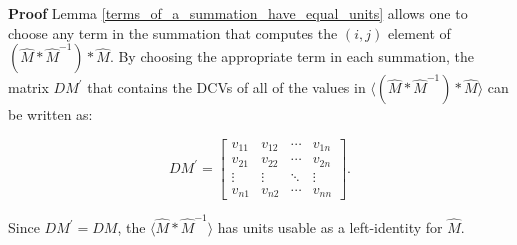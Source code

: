\documentclass[10pt,letterpaper]{article}
\newenvironment{proof}{\noindent\textbf{Proof} }{\qed \newline}
\newcommand{\qed}{\nobreak \ifvmode \relax \else
      \ifdim\lastskip<1.5em \hskip-\lastskip
      \hskip1.5em plus0em minus0.5em \fi \nobreak
      \vrule height0.75em width0.5em depth0.25em\fi}
\numberwithin{equation}{section}
\begin{document}
\begin{proof}
Lemma \ref{terms_of_a_summation_have_equal_units} allows one to choose
any term in the summation that computes the $(i, j)$ element of $(\hat
M * \hat M^{-1}) * \hat M$.  By choosing the appropriate term in each
summation, the matrix $DM^{\prime}$ that contains the DCVs of all of
the values in $\langle (\hat M * \hat M^{-1}) * \hat M \rangle$ can be
written as:

\[ DM^{\prime} = \left[ \begin{matrix} 
  v_{11} & v_{12} & \cdots & v_{1n} \\
  v_{21} & v_{22} & \cdots & v_{2n} \\
  \vdots & \vdots & \ddots & \vdots \\
  v_{n1} & v_{n2} & \cdots & v_{nn}
\end{matrix} \right]. \]

Since $DM^{\prime} = DM$, the $\langle \hat M * \hat M^{-1} \rangle$
has units usable as a left-identity for $\hat M$. \end{proof}
\end{document}
